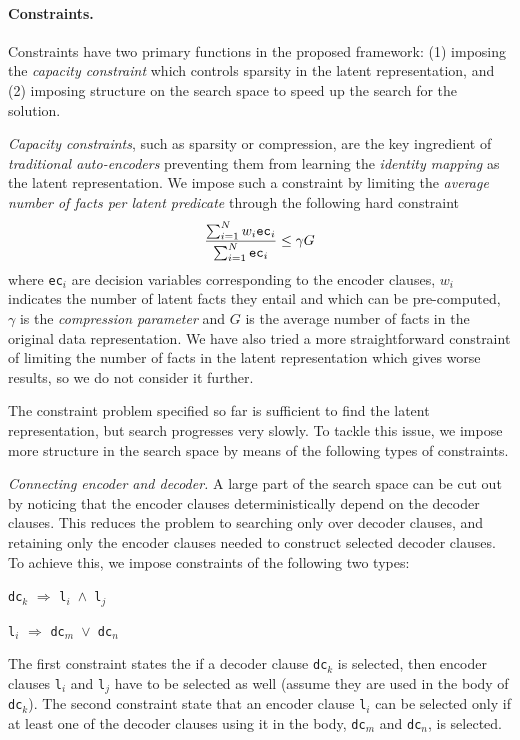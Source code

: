 \paragraph{Constraints.}
Constraints have two primary functions in the proposed framework: (1) imposing the \textit{capacity constraint} which controls sparsity in the latent representation, and (2) imposing structure on the search space to speed up the search for the solution.


\textit{Capacity constraints}, such as sparsity or compression, are the key ingredient of \textit{traditional auto-encoders} preventing them from learning the \textit{identity mapping} as the latent representation.
We impose such a constraint by limiting the \textit{average number of facts per latent predicate} through the following hard constraint
$$ \frac{\sum_{i=1}^{N}w_i\text{\texttt{ec}}_i}{\sum_{i=1}^N\text{\texttt{ec}}_i} \leq \gamma G$$
where \texttt{ec}$_i$ are decision variables corresponding to the encoder clauses, $w_i$ indicates the number of latent facts they entail and which can be pre-computed, $\gamma$ is the \textit{compression parameter} and $G$ is the average number of facts in the original data representation.
We have also tried a more straightforward constraint of limiting the number of facts in the latent representation which gives worse results, so we do not consider it further.


The constraint problem specified so far is sufficient to find the latent representation, but search progresses very slowly.
To tackle this issue, we impose more structure in the search space by means of the following types of constraints.

\textit{Connecting encoder and decoder.}
A large part of the search space can be cut out by noticing that the encoder clauses deterministically depend on the decoder clauses.
This reduces the problem to searching only over decoder clauses, and retaining only the encoder clauses needed to construct selected decoder clauses.
To achieve this, we impose constraints of the following two types:
\begin{center}
	\texttt{dc}$_k$ $\Rightarrow$ \texttt{l$_i$ $\wedge$  l$_j$}

    \texttt{l}$_i$ $\Rightarrow$ \texttt{dc$_m$ $\vee$ dc$_n$}
\end{center}
The first constraint states the if a decoder clause \texttt{dc}$_k$ is selected, then encoder clauses \texttt{l$_i$} and \texttt{l$_j$} have to be selected as well (assume they are used in the body of \texttt{dc}$_k$).
The second constraint state that an encoder clause \texttt{l}$_i$ can be selected only if at least one of the decoder clauses using it in the body, \texttt{dc$_m$} and \texttt{dc$_n$}, is selected.


